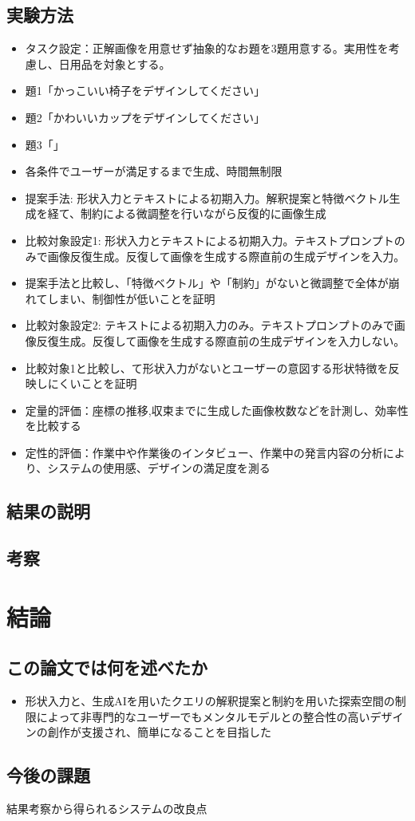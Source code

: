 \documentclass[dvipdfmx]{jlreq}
\begin{document}
\subsection{実験方法}
\begin{itemize}
  \item タスク設定：正解画像を用意せず抽象的なお題を3題用意する。実用性を考慮し、日用品を対象とする。
  \item 題1「かっこいい椅子をデザインしてください」
  \item 題2「かわいいカップをデザインしてください」
  \item 題3「」
  \item 各条件でユーザーが満足するまで生成、時間無制限
  \item 提案手法: 形状入力とテキストによる初期入力。解釈提案と特徴ベクトル生成を経て、制約による微調整を行いながら反復的に画像生成
  \item 比較対象設定1: 形状入力とテキストによる初期入力。テキストプロンプトのみで画像反復生成。反復して画像を生成する際直前の生成デザインを入力。
  \item 提案手法と比較し、「特徴ベクトル」や「制約」がないと微調整で全体が崩れてしまい、制御性が低いことを証明
  \item 比較対象設定2: テキストによる初期入力のみ。テキストプロンプトのみで画像反復生成。反復して画像を生成する際直前の生成デザインを入力しない。
  \item 比較対象1と比較し、て形状入力がないとユーザーの意図する形状特徴を反映しにくいことを証明
  \item 定量的評価：座標の推移,収束までに生成した画像枚数などを計測し、効率性を比較する
  \item 定性的評価：作業中や作業後のインタビュー、作業中の発言内容の分析により、システムの使用感、デザインの満足度を測る
\end{itemize}
\subsection{結果の説明}
\subsection{考察}





\section{結論}
\subsection{この論文では何を述べたか}
\begin{itemize}
  \item 形状入力と、生成AIを用いたクエリの解釈提案と制約を用いた探索空間の制限によって非専門的なユーザーでもメンタルモデルとの整合性の高いデザインの創作が支援され、簡単になることを目指した
\end{itemize}
\subsection{今後の課題}
結果考察から得られるシステムの改良点
\end{document}
